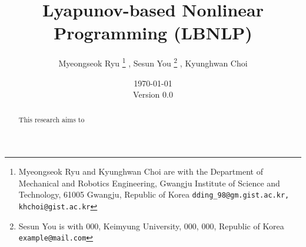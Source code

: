 \documentclass{article}
\title{
    Lyapunov-based Nonlinear Programming (LBNLP)
}
\author{
    Myeongseok Ryu
    \thanks{
        Myeongseok Ryu and Kyunghwan Choi are with the Department of Mechanical and Robotics Engineering, Gwangju Institute of Science and Technology, 61005 Gwangju, Republic of Korea {\tt\small dding\_98@gm.gist.ac.kr, khchoi@gist.ac.kr}}%
    , 
    Sesun You
    \thanks{Sesun You is with 000, Keimyung University, 000, 000, Republic of Korea {\tt\small example@mail.com}}%
    ,
    Kyunghwan Choi
    \footnotemark[1]
}
\date{
    \today
    \\
    Version 0.0
}
\newcommand*{\template}{../template}
\begin{document}
\maketitle

\begin{abstract}
    This research aims to 
\end{abstract}

\tableofcontents







\begin{appendices}
\end{appendices}




\end{document}
